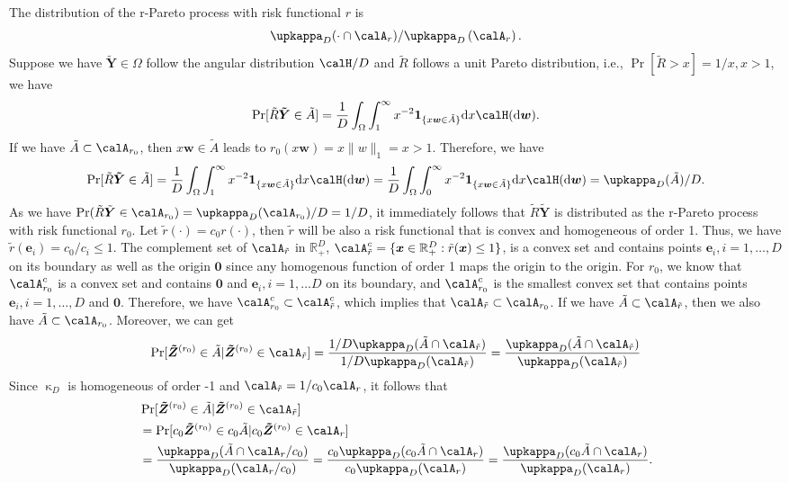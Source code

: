\documentclass[12pt]{article}
\begin{document}
    The distribution of the r-Pareto process with risk functional $r$ is 
    $$\upkappa_D(\cdot\cap \calA_r )/\upkappa_D\left(\calA_r\right).$$ 
    Suppose we have $\bm{\tilde Y}\in\Omega$ follow the angular distribution $\calH/D$ and $\tilde R$ follows a unit Pareto distribution, i.e., $\Pr[\tilde R>x]=1/x, x>1$, we have
    $$\Pr[\tilde R\bm{\tilde Y}\in \tilde A] = \frac{1}{D}\int_{\Omega}\int_{1}^{\infty} x^{-2}\bm 1_{\{x\bm w\in \tilde A\}}\text dx\calH(\text d\bm w).$$
    If we have $\tilde A\subset\calA_{r_0}$, then $x\bm w\in\tilde A$ leads to $r_0(x\bm w)=x\|w\|_1=x >1$. Therefore, we have 
    $$\Pr[\tilde R\bm{\tilde Y}\in \tilde A] = \frac{1}{D}\int_{\Omega}\int_{1}^{\infty} x^{-2}\bm 1_{\{x\bm w\in \tilde A\}}\text dx\calH(\text d\bm w) = \frac{1}{D}\int_{\Omega}\int_{0}^{\infty} x^{-2}\bm 1_{\{x\bm w\in \tilde A\}}\text dx\calH(\text d\bm w) = \upkappa_D(\tilde A)/D.$$ 
    As we have $\Pr( \tilde R\tilde {\bm Y} \in \calA_{r_0}) = \upkappa_D(\calA_{r_0})/D=1/D$, it immediately follows that $\tilde R\bm {\tilde Y}$ is distributed as the r-Pareto process with risk functional $r_0$. Let $\tilde r(\cdot) = c_0 r(\cdot)$, then $\tilde r$ will be also a risk functional that is convex and homogeneous of order 1. Thus, we have $\tilde r(\bm e_i)=c_0/c_i\leq 1$. The complement set of $\calA_{\tilde r}$ in $\mathbb R_+^D$, $\calA_{\tilde r}^c=\{\bm x\in\mathbb R_+^D: \tilde r(\bm x)\leq 1\}$, is a convex set and contains points $\bm e_i, i=1,\dots,D$ on its boundary as well as the origin $\bm 0$ since any homogenous function of order 1 maps the origin to the origin. For $r_0$, we know that $\calA_{r_0}^c$ is a convex set and contains $\bm 0$ and $\bm e_i,i=1,\dots D$ on its boundary, and $\calA_{r_0}^c$ is the smallest convex set that contains points $\bm e_i,i=1,\dots,D$ and $\bm 0$. Therefore, we have $\calA_{r_0}^c\subset \calA_{\tilde r}^c$, which implies that $\calA_{\tilde r} \subset \calA_{r_0}$. If we have $\tilde A\subset\calA_{\tilde r}$, then we also have  $\tilde A\subset\calA_{r_0}$. Moreover, we can get
    \begin{equation}
        \Pr[\bm{\tilde Z}^{(r_0)}\in \tilde A | \bm{\tilde Z}^{(r_0)} \in \calA_{\tilde r} ] = \frac{1/D\upkappa_D(\tilde A\cap \calA_{\tilde r})}{1/D\upkappa_D(\calA_{\tilde r})} = \frac{\upkappa_D(\tilde A \cap \calA_{\tilde r})}{\upkappa_D(\calA_{\tilde r})}
    \end{equation}
    Since $\upkappa_D$ is homogeneous of order -1 and $\calA_{\tilde r} =  1/c_0\calA_r$, it follows that
    \begin{align*}
        & \Pr[\bm{\tilde Z}^{(r_0)}\in \tilde A | \bm{\tilde Z}^{(r_0)} \in \calA_{\tilde r} ] \\
        &= \Pr[c_0\bm{\tilde Z}^{(r_0)}\in c_0\tilde A | c_0\bm{\tilde Z}^{(r_0)} \in \calA_{r} ] \\
        &= \frac{\upkappa_D(\tilde A \cap \calA_r/c_0)}{\upkappa_D(\calA_{r}/c_0)} = \frac{c_0\upkappa_D(c_0\tilde A \cap \calA_r)}{c_0\upkappa_D(\calA_{r})} = \frac{\upkappa_D(c_0\tilde A \cap \calA_r)}{\upkappa_D(\calA_{r})}. 
    \end{align*}
\end{document}

